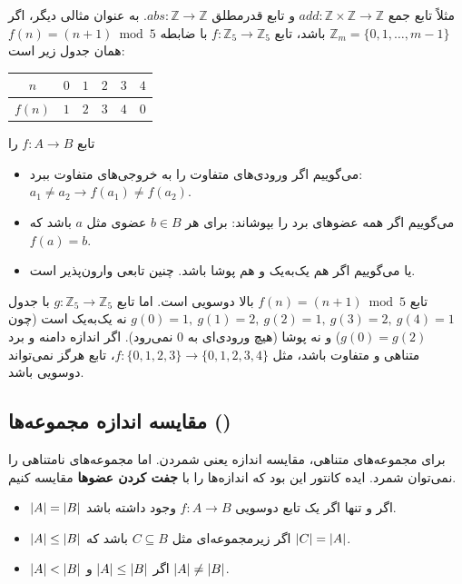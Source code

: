 مثلاً تابع جمع $\mathit{add}:\mathbb{Z}\times\mathbb{Z}\to\mathbb{Z}$ و تابع قدرمطلق $\mathit{abs}:\mathbb{Z}\to\mathbb{Z}$. به عنوان مثالی دیگر، اگر $\mathbb{Z}_m=\{0,1,\dots,m-1\}$ باشد، تابع $f:\mathbb{Z}_5\to\mathbb{Z}_5$ با ضابطه $f(n)=(n+1)\bmod 5$ همان جدول زیر است:
\begin{ltrfig}
\begin{tabular}{c|ccccc}
$n$ & $0$ & $1$ & $2$ & $3$ & $4$\\ \hline
$f(n)$ & $1$ & $2$ & $3$ & $4$ & $0$
\end{tabular}
\end{ltrfig}

\begin{definition}
تابع $f:A\to B$ را
\begin{itemize}
\item {} می‌گوییم اگر ورودی‌های متفاوت را به خروجی‌های متفاوت ببرد: $a_1\neq a_2\rightarrow f(a_1)\neq f(a_2)$.
\item {} می‌گوییم اگر همه عضوهای برد را بپوشاند: برای هر $b\in B$ عضوی مثل $a$ باشد که $f(a)=b$.
\item {} یا  می‌گوییم اگر هم یک‌به‌یک و هم پوشا باشد. چنین تابعی وارون‌پذیر است.
\end{itemize}
\end{definition}

\begin{example}
تابع $f(n)=(n+1)\bmod 5$ بالا دوسویی است. اما تابع $g:\mathbb{Z}_5\to\mathbb{Z}_5$ با جدول $g(0)=1,\ g(1)=2,\ g(2)=1,\ g(3)=2,\ g(4)=1$ نه یک‌به‌یک است (چون $g(0)=g(2)$) و نه پوشا (هیچ ورودی‌ای به $0$ نمی‌رود). اگر اندازه دامنه و برد متناهی و متفاوت باشد، مثل $f:\{0,1,2,3\}\to\{0,1,2,3,4\}$، تابع هرگز نمی‌تواند دوسویی باشد.
\end{example}

\subsection{مقایسه اندازه مجموعه‌ها ()}\label{sec:cardinality}
برای مجموعه‌های متناهی، مقایسه اندازه یعنی شمردن. اما مجموعه‌های نامتناهی را نمی‌توان شمرد. ایده کانتور این بود که اندازه‌ها را با \textbf{جفت کردن عضوها} مقایسه کنیم.

\begin{definition}[هم‌اندازگی]
\begin{itemize}
\item $\lvert A\rvert=\lvert B\rvert$ اگر و تنها اگر یک تابع دوسویی $f:A\to B$ وجود داشته باشد.
\item $\lvert A\rvert\le\lvert B\rvert$ اگر زیرمجموعه‌ای مثل $C\subseteq B$ باشد که $\lvert C\rvert=\lvert A\rvert$.
\item $\lvert A\rvert<\lvert B\rvert$ اگر $\lvert A\rvert\le\lvert B\rvert$ و $\lvert A\rvert\neq\lvert B\rvert$.
\end{itemize}
\end{definition}

